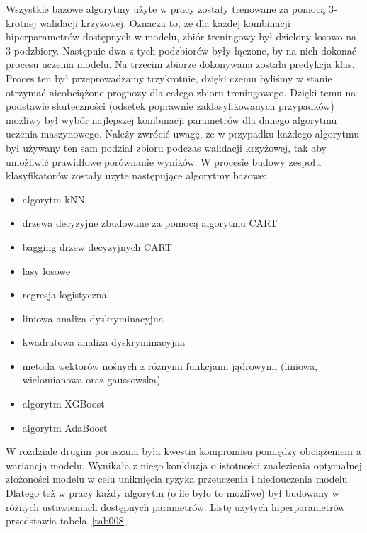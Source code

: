 \documentclass[12pt,a4paper,twoside,openany]{book}
\begin{document}
Wszystkie bazowe algorytmy użyte w pracy zostały trenowane za pomocą 3-krotnej walidacji krzyżowej. Oznacza to, że dla każdej kombinacji hiperparametrów dostępnych w modelu, zbiór treningowy był dzielony losowo na 3 podzbiory. Następnie dwa z tych podzbiorów były łączone, by na nich dokonać procesu uczenia modelu. Na trzecim zbiorze dokonywana została predykcja klas. Proces ten był przeprowadzamy trzykrotnie, dzięki czemu byliśmy w stanie otrzymać nieobciążone prognozy dla całego zbioru treningowego. Dzięki temu na podstawie skuteczności (odsetek poprawnie zaklasyfikowanych przypadków) możliwy był wybór najlepszej kombinacji parametrów dla danego algorytmu uczenia maszynowego. Należy zwrócić uwagę, że w przypadku każdego algorytmu był używany ten sam podział zbioru podczas walidacji krzyżowej, tak aby umożliwić prawidłowe porównanie wyników.
W procesie budowy zespołu klasyfikatorów zostały użyte następujące algorytmy bazowe:
\begin{itemize}
\item algorytm kNN
\item drzewa decyzyjne zbudowane za pomocą algorytmu CART
\item bagging drzew decyzyjnych CART
\item lasy losowe
\item regresja logistyczna
\item liniowa analiza dyskryminacyjna
\item kwadratowa analiza dyskryminacyjna
\item metoda wektorów nośnych z różnymi funkcjami jądrowymi (liniowa, wielomianowa oraz gaussowska)
\item algorytm XGBoost
\item algorytm AdaBoost
\end{itemize}

W rozdziale drugim poruszana była kwestia kompromisu pomiędzy obciążeniem a wariancją modelu. Wynikała z niego konkluzja o istotności znalezienia optymalnej złożoności modelu w celu uniknięcia ryzyka przeuczenia i niedouczenia modelu. Dlatego też w pracy każdy algorytm (o ile było to możliwe) był budowany w różnych ustawieniach dostępnych parametrów. Listę użytych hiperparametrów przedstawia tabela~\ref{tab008}.
\end{document}
